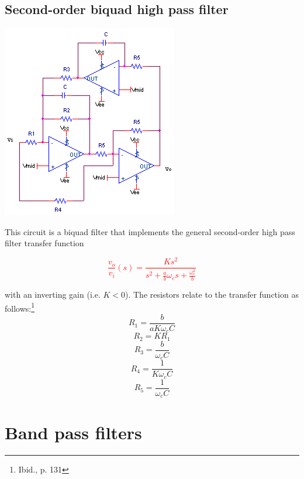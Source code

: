 \subsection{Second-order biquad high pass filter}
\begin{center}
	\includegraphics{schematics/2ndorderbiquadHPfilter.PNG}
\end{center}
This circuit is a biquad filter that implements the general second-order high pass filter transfer function

\textcolor{red}{
\begin{equation}
\frac{v_{o}}{v_{i}}(s) = \frac{Ks^{2}}{s^{2} + \frac{a}{b}\omega_{c}s + \frac{\omega_{c}^{2}}{b}}
\label{eq:2ndorderbiquadHPfilter}
\end{equation}
}

with an inverting gain (i.e. $K < 0$). The resistors relate to the transfer function as follows:\footnote{Ibid., p. 131}
\begin{equation}
R_{1} = \frac{b}{aK\omega_{c}C}
\end{equation}
\begin{equation}
R_{2} = KR_{1}
\end{equation}
\begin{equation}
R_{3} = \frac{b}{\omega_{c}C}
\end{equation}
\begin{equation}
R_{4} = \frac{1}{K\omega_{c}C}
\end{equation}
\begin{equation}
R_{5} = \frac{1}{\omega_{c}C}
\end{equation}

\section{Band pass filters}

